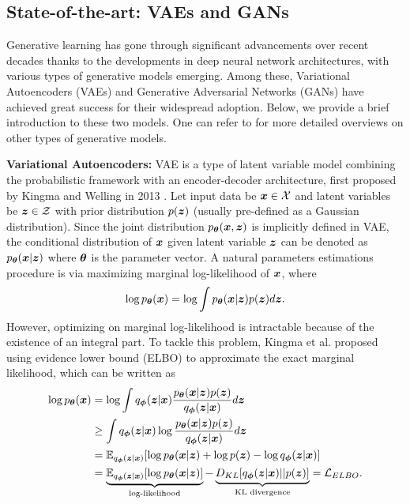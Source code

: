 \subsection{State-of-the-art: VAEs and GANs}
\label{subsec-VAEGAN}
Generative learning has gone through significant advancements over recent decades thanks to the developments in deep neural network architectures, with various types of generative models emerging.  Among these, Variational Autoencoders (VAEs) and Generative Adversarial Networks (GANs) have achieved great success for their widespread adoption. Below, we provide a brief introduction to these two models. One can refer to \cite{xuOverviewDeepGenerative2015} for more detailed overviews on other types of generative models.

\noindent \textbf{Variational Autoencoders:} VAE is a type of latent variable model combining the probabilistic framework with an encoder-decoder architecture, first proposed by Kingma and Welling in 2013 \cite{kingmaAutoEncodingVariationalBayes2022}. Let input data be $\boldsymbol{x}\in \mathcal{X}$ and latent variables be $\boldsymbol{z}\in \mathcal{Z}$ with prior distribution $p(\boldsymbol{z})$ (usually pre-defined as a Gaussian distribution). Since the joint distribution $p_{\boldsymbol{\theta}}(\boldsymbol{x},\boldsymbol{z})$ is implicitly defined in VAE, the conditional distribution of $\boldsymbol{x}$ given latent variable $\boldsymbol{z}$ can be denoted as $p_{\boldsymbol{\theta}}(\boldsymbol{x}|\boldsymbol{z})$ where $\boldsymbol{\theta}$ is the parameter vector. A natural parameters estimations procedure is via maximizing marginal log-likelihood of $\boldsymbol{x}$, where
\begin{equation}
    \log p_{\boldsymbol{\theta}}(\boldsymbol{x}) = \log \int p_{\boldsymbol{\theta}}(\boldsymbol{x}|\boldsymbol{z})p(\boldsymbol{z})d\boldsymbol{z}.
\end{equation}
However, optimizing on marginal log-likelihood is intractable because of the existence of an integral part. To tackle this problem, Kingma et al. proposed using evidence lower bound (ELBO) to approximate the exact marginal likelihood, which can be written as 
\begin{equation}
    \begin{aligned}
        \log p_{\boldsymbol{\theta}}(\boldsymbol{x}) &= \log \int q_{\boldsymbol{\phi}}(\boldsymbol{z}|\boldsymbol{x}) \frac{p_{\boldsymbol{\theta}}(\boldsymbol{x}|\boldsymbol{z})p(\boldsymbol{z})}{q_{\boldsymbol{\phi}}(\boldsymbol{z}|\boldsymbol{x})}d\boldsymbol{z} \\
        &\geq \int q_{\boldsymbol{\phi}}(\boldsymbol{z}|\boldsymbol{x}) \log \frac{p_{\boldsymbol{\theta}}(\boldsymbol{x}|\boldsymbol{z})p(\boldsymbol{z})}{q_{\boldsymbol{\phi}}(\boldsymbol{z}|\boldsymbol{x})} d\boldsymbol{z} \\
        &= \mathbb{E}_{q_{\boldsymbol{\phi}}(\boldsymbol{z}|\boldsymbol{x})} [\log p_{\boldsymbol{\theta}}(\boldsymbol{x}|\boldsymbol{z}) + \log p(\boldsymbol{z}) - \log q_{\boldsymbol{\phi}}(\boldsymbol{z}|\boldsymbol{x})] \\
        &= \underbrace{\mathbb{E}_{q_{\boldsymbol{\phi}}(\boldsymbol{z}|\boldsymbol{x})}[\log p_{\boldsymbol{\theta}}(\boldsymbol{x}|\boldsymbol{z})]}_{\text{log-likelihood}} - \underbrace{D_{KL}[q_{\boldsymbol{\phi}}(\boldsymbol{z}|\boldsymbol{x}) || p(\boldsymbol{z})]}_{\text{KL divergence}} = \mathcal{L}_{ELBO}.
    \end{aligned}
\end{equation}
